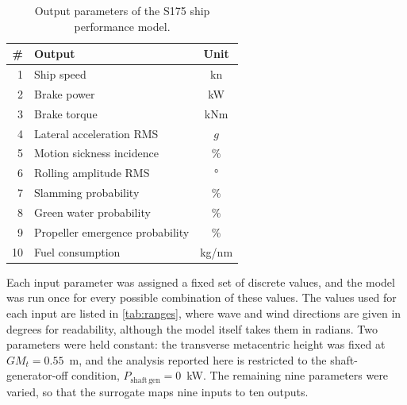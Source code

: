 \documentclass[final,5p,times,twocolumn,numbers]{elsarticle}
\begin{document}
\begin{table}[ht]
\centering
\caption{Output parameters of the S175 ship performance model.}
\label{tab:outputs}
\footnotesize
\setlength{\tabcolsep}{12pt}
\renewcommand{\arraystretch}{1.1}
\begin{tabular}{r lc}
\toprule
\# & Output & Unit \\
\midrule
 1 & Ship speed                      & \unit{kn} \\
 2 & Brake power                     & \unit{kW} \\
 3 & Brake torque                    & \unit{kNm} \\
 4 & Lateral acceleration RMS        & $g$ \\
 5 & Motion sickness incidence       & \% \\
 6 & Rolling amplitude RMS           & \unit{\degree} \\
 7 & Slamming probability            & \% \\
 8 & Green water probability         & \% \\
 9 & Propeller emergence probability & \% \\
10 & Fuel consumption                & \unit{kg/nm} \\
\bottomrule
\end{tabular}
\end{table}

Each input parameter was assigned a fixed set of discrete values, and the model was run once for every possible combination of these values. The values used for each input are listed in \autoref{tab:ranges}, where wave and wind directions are given in degrees for readability, although the model itself takes them in radians. Two parameters were held constant: the transverse metacentric height was fixed at $GM_t = 0.55$~m, and the analysis reported here is restricted to the shaft-generator-off condition, $P_\mathrm{shaft\,gen} = 0$~kW. The remaining nine parameters were varied, so that the surrogate maps nine inputs to ten outputs.
\end{document}
